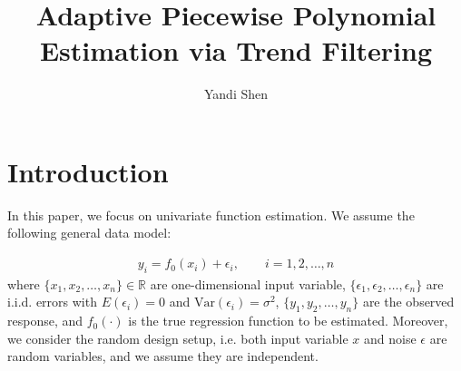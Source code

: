 \documentclass[a4paper]{article}
\title{Adaptive Piecewise Polynomial Estimation via Trend Filtering}
\author{Yandi Shen}
\newcommand{\RR}{\mathbb{R}}
\begin{document}
\maketitle


\section{Introduction}
\label{sec:intro}
In this paper, we focus on univariate function estimation. We assume the following general data model:

\begin{align}
y_i = f_0(x_i) + \epsilon_i, \qquad i = 1, 2, \ldots, n  \label{nonpara_model}
\end{align}
where $\{x_1, x_2, \ldots, x_n\}\in\RR$ are one-dimensional input variable, $\{\epsilon_1, \epsilon_2, \ldots, \epsilon_n\}$ are i.i.d. errors with $E(\epsilon_i) = 0$ and $\mbox{Var}(\epsilon_i) = \sigma^2$, $\{y_1, y_2, \ldots, y_n\}$ are the observed response, and $f_0(\cdot)$ is the true regression function to be estimated. Moreover, we consider the random design setup, i.e. both input variable $x$ and noise $\epsilon$ are random variables, and we assume they are independent. 
\end{document}
